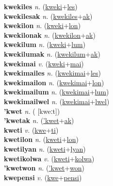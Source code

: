 \textbf{kwekiles} \textit{n.} (\hyperref[kweki]{kweki}+\hyperref[les]{les})
 \label{kwekiles} \\
\textbf{kwekilesak} \textit{n.} (\hyperref[kwekiles]{kwekiles}+\hyperref[ak]{ak})
 \label{kwekilesak} \\
\textbf{kwekilon} \textit{n.} (\hyperref[kweki]{kweki}+\hyperref[lon]{lon})
 \label{kwekilon} \\
\textbf{kwekilonak} \textit{n.} (\hyperref[kwekilon]{kwekilon}+\hyperref[ak]{ak})
 \label{kwekilonak} \\
\textbf{kwekilum} \textit{n.} (\hyperref[kweki]{kweki}+\hyperref[lum]{lum})
 \label{kwekilum} \\
\textbf{kwekilumak} \textit{n.} (\hyperref[kwekilum]{kwekilum}+\hyperref[ak]{ak})
 \label{kwekilumak} \\
\textbf{kwekimai} \textit{v.} (\hyperref[kweki]{kweki}+\hyperref[mai]{mai})
 \label{kwekimai} \\
\textbf{kwekimailes} \textit{n.} (\hyperref[kwekimai]{kwekimai}+\hyperref[les]{les})
 \label{kwekimailes} \\
\textbf{kwekimailon} \textit{n.} (\hyperref[kwekimai]{kwekimai}+\hyperref[lon]{lon})
 \label{kwekimailon} \\
\textbf{kwekimailum} \textit{n.} (\hyperref[kwekimai]{kwekimai}+\hyperref[lum]{lum})
 \label{kwekimailum} \\
\textbf{kwekimailwel} \textit{n.} (\hyperref[kwekimai]{kwekimai}+\hyperref[lwel]{lwel})
 \label{kwekimailwel} \\
\textbf{'kwet} \textit{n.} ( [kweːt])
 \label{'kwet} \\
\textbf{'kwetak} \textit{n.} (\hyperref['kwet]{'kwet}+\hyperref[ak]{ak})
 \label{'kwetak} \\
\textbf{kweti} \textit{v.} (\hyperref[kwe]{kwe}+\hyperref[ti]{ti})
 \label{kweti} \\
\textbf{kwetilon} \textit{n.} (\hyperref[kweti]{kweti}+\hyperref[lon]{lon})
 \label{kwetilon} \\
\textbf{kwetilyan} \textit{n.} (\hyperref[kweti]{kweti}+\hyperref[lyan]{lyan})
 \label{kwetilyan} \\
\textbf{kwetikolwa} \textit{v.} (\hyperref[kweti]{kweti}+\hyperref[kolwa]{kolwa})
 \label{kwetikolwa} \\
\textbf{'kwetwon} \textit{n.} (\hyperref['kwet]{'kwet}+\hyperref[won]{won})
 \label{'kwetwon} \\
\textbf{kwepensi} \textit{v.} (\hyperref[kwe]{kwe}+\hyperref[pensi]{pensi})
 \label{kwepensi} \\
